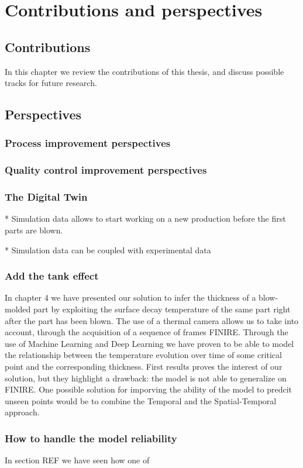 \chapter{Contributions and perspectives} \label{Contributions and perspectives}
\minitoc

\section{Contributions}

In this chapter we review the contributions of this thesis, and discuss possible tracks for future research.

\section{Perspectives}

\subsection{Process improvement perspectives}


\subsection{Quality control improvement perspectives}

\subsection{The Digital Twin}
* Simulation data allows to start working on a new production before the first parts are blown.

* Simulation data can be coupled with experimental data

\subsection{Add the tank effect}

In chapter 4 we have presented our solution to infer the thickness of a blow-molded part by exploiting the surface decay temperature of the same part right after the part has been blown. The use of a thermal camera allows us to take into account, through the acquisition of a sequence of frames FINIRE.
Through the use of Machine Learning and Deep Learning we have proven to be able to model the relationship between the temperature evolution over time of some critical point and the corresponding thickness. First results proves the interest of our solution, but they highlight a drawback: the model is not able to generalize on FINIRE. One possible solution for imporving the ability of the model to predcit unseen points would be to combine the Temporal and the Spatial-Temporal approach. 

\subsection{How to handle the model reliability}

In section REF we have seen how one of